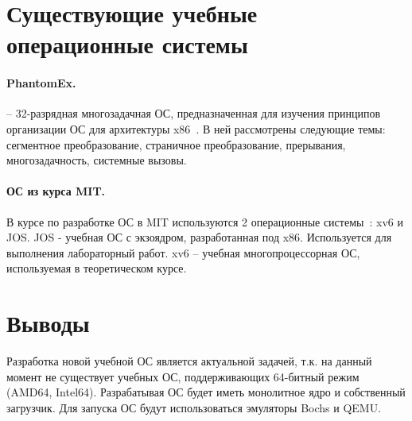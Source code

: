 \section{Существующие учебные операционные системы}
\paragraph{PhantomEx.} -- 32-разрядная многозадачная ОС, предназначенная для изучения
принципов организации ОС для архитектуры x86~\cite{phantomex}. В ней рассмотрены следующие темы:
сегментное преобразование, страничное преобразование, прерывания, многозадачность, системные вызовы.

\paragraph{ОС из курса MIT.} В курсе по разработке ОС в MIT используются 2 операционные системы~\cite{mit_os_dev}:
xv6 и JOS. JOS - учебная ОС с экзоядром, разработанная под x86. Используется для выполнения
лабораторный работ. xv6 -- учебная многопроцессорная ОС, используемая в теоретическом курсе.

\section{Выводы}
Разработка новой учебной ОС является актуальной задачей, т.к. на данный момент не существует учебных ОС,
поддерживающих 64-битный режим (AMD64, Intel64). Разрабатывая ОС будет иметь монолитное ядро и собственный
загрузчик. Для запуска ОС будут использоваться эмуляторы Bochs и QEMU.
